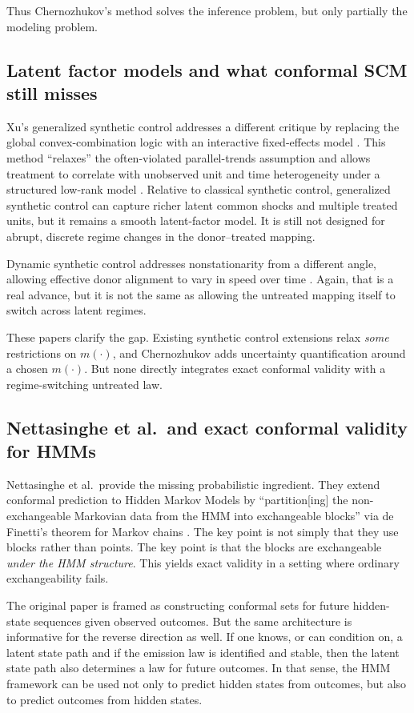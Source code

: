 \documentclass[11pt]{article}
\begin{document}
Thus Chernozhukov's method solves the inference problem, but only partially the modeling problem.

\subsection{Latent factor models and what conformal SCM still misses}

Xu's generalized synthetic control addresses a different critique by replacing the global convex-combination logic with an interactive fixed-effects model \citep{Xu2017}. This method \enquote{relaxes} the often-violated parallel-trends assumption and allows treatment to correlate with unobserved unit and time heterogeneity under a structured low-rank model \citep[p.~57]{Xu2017}. Relative to classical synthetic control, generalized synthetic control can capture richer latent common shocks and multiple treated units, but it remains a smooth latent-factor model. It is still not designed for abrupt, discrete regime changes in the donor--treated mapping.

Dynamic synthetic control addresses nonstationarity from a different angle, allowing effective donor alignment to vary in speed over time \citep{Cao2025}. Again, that is a real advance, but it is not the same as allowing the untreated mapping itself to switch across latent regimes.

These papers clarify the gap. Existing synthetic control extensions relax \emph{some} restrictions on $m(\cdot)$, and Chernozhukov adds uncertainty quantification around a chosen $m(\cdot)$. But none directly integrates exact conformal validity with a regime-switching untreated law.

\subsection{Nettasinghe et al.\ and exact conformal validity for HMMs}

Nettasinghe et al.\ provide the missing probabilistic ingredient. They extend conformal prediction to Hidden Markov Models by \enquote{partition[ing] the non-exchangeable Markovian data from the HMM into exchangeable blocks} via de Finetti's theorem for Markov chains \citep{Nettasinghe2023}. The key point is not simply that they use blocks rather than points. The key point is that the blocks are exchangeable \emph{under the HMM structure}. This yields exact validity in a setting where ordinary exchangeability fails.

The original paper is framed as constructing conformal sets for future hidden-state sequences given observed outcomes. But the same architecture is informative for the reverse direction as well. If one knows, or can condition on, a latent state path and if the emission law is identified and stable, then the latent state path also determines a law for future outcomes. In that sense, the HMM framework can be used not only to predict hidden states from outcomes, but also to predict outcomes from hidden states.
\end{document}
